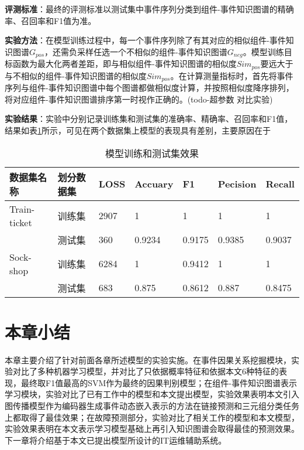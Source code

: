 \textbf{评测标准}：最终的评测标准以测试集中事件序列分类到组件-事件知识图谱的精确率、召回率和F1值为准。

\textbf{实验方法}：在模型训练过程中，每一个事件序列除了有其对应的相似组件-事件知识图谱$G_{pos}$，还需负采样任选一个不相似的组件-事件知识图谱$G_{neg}$。模型训练目标函数为最大化两者差距，即与相似组件-事件知识图谱的相似度$Sim_{pos}$要远大于与不相似的组件-事件知识图谱的相似度$Sim_{pos}$。在计算测量指标时，首先将事件序列与组件-事件知识图谱中每个图谱都做相似度计算，并按照相似度降序排列，将对应组件-事件知识图谱排序第一时视作正确的。(todo-超参数 对比实验)

\textbf{实验结果}：实验中分别记录训练集和测试集的准确率、精确率、召回率和F1值，结果如表\ref{experiment-predict-train-test}所示，可见在两个数据集上模型的表现具有差别，主要原因在于
\begin{table}[htbp]
    \caption{模型训练和测试集效果}
    \centering
    \label{experiment-predict-train-test}
    \begin{tabular}{lllllll}
    \hline
    数据集名称        & 划分数据集 & LOSS & Accuary & F1     & Pecision & Recall \\ \hline
    Train-ticket & 训练集   & 2907 & 1       & 1      & 1        & 1      \\
                 & 测试集   & 360  & 0.9234  & 0.9175 & 0.9385   & 0.9037 \\ \hline
    Sock-shop    & 训练集   & 6284 & 1       & 0.9412 & 1        & 1      \\
                 & 测试集   & 683  & 0.875   & 0.8612 & 0.887    & 0.8475 \\ \hline
    \end{tabular}
    \end{table}
\section{本章小结}
本章主要介绍了针对前面各章所述模型的实验实施。在事件因果关系挖掘模块，实验对比了多种机器学习模型，并对比了只依据概率特征和依据本文6种特征的表现，最终取F1值最高的SVM作为最终的因果判别模型；在组件-事件知识图谱表示学习模块，实验对比了已有工作中的模型和本文提出模型，实验效果表明本文引入图传播模型作为编码器生成事件动态嵌入表示的方法在链接预测和三元组分类任务上都取得了最佳效果；在故障预测部分，实验对比了相关工作的模型和本文模型，实验效果表明在本文表示学习模型基础上再引入知识图谱会取得最佳的预测效果。下一章将介绍基于本文已提出模型所设计的IT运维辅助系统。




